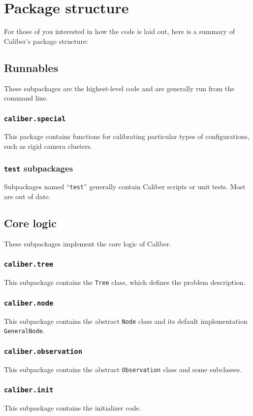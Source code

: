 \section{Package structure}
For those of you interested in how the code is laid out, here is a summary of Caliber's package structure:

\subsection{Runnables}
These subpackages are the highest-level code and are generally run from the command line.
\subsubsection{\texttt{caliber.special}}
This package contains functions for calibrating particular types of configurations, such as rigid camera clusters.
\subsubsection{\texttt{test} subpackages}
Subpackages named ``\texttt{test}'' generally contain Caliber scripts or unit tests. Most are out of date.

\subsection{Core logic}
These subpackages implement the core logic of Caliber.
\subsubsection{\texttt{caliber.tree}}
This subpackage contains the \texttt{Tree} class, which defines the problem description.
\subsubsection{\texttt{caliber.node}}
This subpackage contains the abstract \texttt{Node} class and its default implementation \texttt{GeneralNode}.
\subsubsection{\texttt{caliber.observation}}
This subpackage contains the abstract \texttt{Observation} class and some subclasses.
\subsubsection{\texttt{caliber.init}}
This subpackage contains the initializer code.
